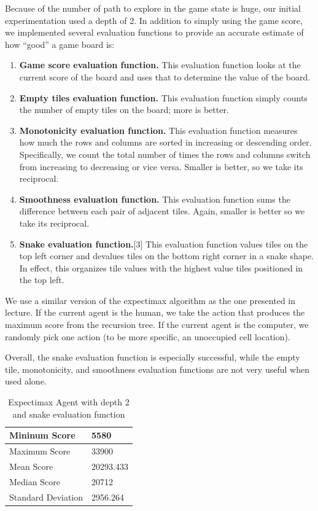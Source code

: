 \documentclass[9pt,twocolumn]{article}
\begin{document}
Because of the number of path to explore in the game state is huge, our initial experimentation used a depth of 2. In addition to simply using the game score, we implemented several evaluation functions to provide an accurate estimate of how “good” a game board is:

\begin{enumerate}

\item \textbf{Game score evaluation function.} This evaluation function looks at the current score of the board and uses that to determine the value of the board.
\item \textbf{Empty tiles evaluation function.} This evaluation function simply counts the number of empty tiles on the board; more is better.
\item \textbf{Monotonicity evaluation function.} This evaluation function measures how much the rows and columns are sorted in increasing or descending order. Specifically, we count the total number of times the rows and columns switch from increasing to decreasing or vice versa. Smaller is better, so we take its reciprocal.
\item \textbf{Smoothness evaluation function.} This evaluation function sums the difference between each pair of adjacent tiles. Again, smaller is better so we take its reciprocal.
\item \textbf{Snake evaluation function.}[3] This evaluation function values tiles on the top left corner and devalues tiles on the bottom right corner in a snake shape. In effect, this organizes tile values with the highest value tiles positioned in the top left.

\end{enumerate}

We use a similar version of the expectimax algorithm as the one presented in lecture. If the current agent is the human, we take the action that produces the maximum score from the recursion tree. If the current agent is the computer, we randomly pick one action (to be more specific, an unoccupied cell location).

Overall, the snake evaluation function is especially successful, while the empty tile, monotonicity, and smoothness evaluation functions are not very useful when used alone.

\begin{table}[!htbp]

\centering

\begin{tabular}{|l|l|}
\hline
Mininum Score      & 5580 \\ \hline
Maximum Score      & 33900 \\ \hline
Mean Score         & 20293.433 \\ \hline
Median Score       & 20712 \\ \hline
Standard Deviation & 2956.264 \\ \hline
\end{tabular}

\caption{Expectimax Agent with depth 2 and snake evaluation function}

\end{table}
\end{document}
